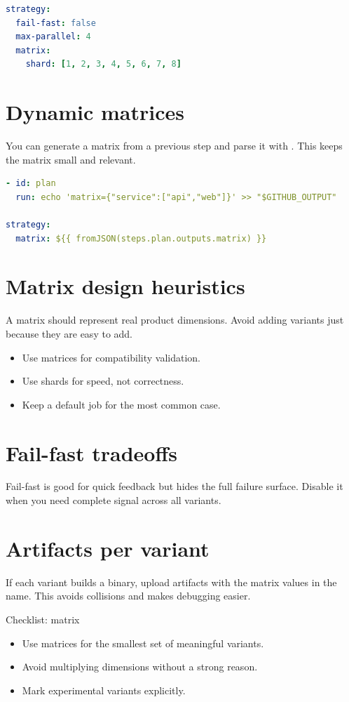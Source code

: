 \begin{lstlisting}[language=YAML]
strategy:
  fail-fast: false
  max-parallel: 4
  matrix:
    shard: [1, 2, 3, 4, 5, 6, 7, 8]
\end{lstlisting}

\section{Dynamic matrices}
You can generate a matrix from a previous step and parse it with .
This keeps the matrix small and relevant.

\begin{lstlisting}[language=YAML]
- id: plan
  run: echo 'matrix={"service":["api","web"]}' >> "$GITHUB_OUTPUT"

strategy:
  matrix: ${{ fromJSON(steps.plan.outputs.matrix) }}
\end{lstlisting}

\section{Matrix design heuristics}
A matrix should represent real product dimensions.
Avoid adding variants just because they are easy to add.

\begin{itemize}[nosep]
  \item Use matrices for compatibility validation.
  \item Use shards for speed, not correctness.
  \item Keep a default job for the most common case.
\end{itemize}

\section{Fail-fast tradeoffs}
Fail-fast is good for quick feedback but hides the full failure surface.
Disable it when you need complete signal across all variants.

\section{Artifacts per variant}
If each variant builds a binary, upload artifacts with the matrix values in the name.
This avoids collisions and makes debugging easier.

\begin{checklistbox}{Checklist: matrix}
\begin{itemize}[nosep]
  \item Use matrices for the smallest set of meaningful variants.
  \item Avoid multiplying dimensions without a strong reason.
  \item Mark experimental variants explicitly.
\end{itemize}
\end{checklistbox}
